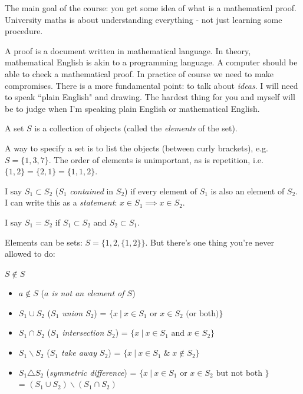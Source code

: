 \documentclass[10pt]{scrartcl}
\begin{document}
The main    goal of the course: you get some idea of what is a mathematical proof. University maths is about understanding everything - not just learning some procedure.

 A proof is a document written in mathematical language. In theory, mathematical English is akin to a programming language. A computer should be able to check a mathematical proof. In practice of course we need to make compromises. There is a more fundamental point: to talk about \emph{ideas}. I will need to speak ``plain English" and drawing.  The hardest thing for you and myself will be to judge when I'm speaking plain English or mathematical English.

\vspace*{5pt}
\label{sub:sets}

\begin{definition}
A set $S$ is  a collection of objects (called the \emph{elements} of the set).
\end{definition}
A way to specify a set is to list the objects (between curly brackets), e.g. $S = \{1,3,7\}$. The order of elements is unimportant, as is repetition, i.e. $\{1,2\} = \{2,1\} = \{1,1,2\}$.\\


\begin{definition}
I say $S_1 \subset S_2$ ($S_1$ \emph{contained} in $S_2$) if every element of $S_1$ is also an element of $S_2$. I can write this as a \emph{statement}: $x \in S_1 \implies x \in S_2$.

I say $S_1 = S_2$ if $S_1 \subset S_2$ and $S_2 \subset S_1$.
\end{definition}


 Elements can be sets: $S = \{1,2,\{1,2\}\}$. But there's one thing you're never allowed to do:\vspace*{5pt}

\begin{axiom}
$S \not \in S$	
\end{axiom}

\begin{definition}
\begin{itemize}
\item $a \not \in S$ (\emph{$a$ is not an element of $S$})
\item $S_1 \cup S_2$ (\emph{$S_1$ union $S_2$}) = $\{x ~|~ x \in S_1 \text{ or } x \in S_2 \text{ (or both)}\}$
\item $S_1 \cap S_2$ (\emph{$S_1$ intersection $S_2$}) = $\{x ~|~ x \in S_1 \text{ and } x \in S_2\}$
\item $S_1 \backslash S_2$ (\emph{$S_1$ take away $S_2$}) = $\{x ~|~ x \in S_1 \;\&\; x \not \in S_2\}$
\item $S_1 \triangle S_2$ (\emph{symmetric difference}) = $\{x ~|~ x \in S_1 \text{ or } x \in S_2 \text{ but not both }\}$\\ = $(S_1 \cup S_2) \backslash (S_1 \cap S_2)$
\end{itemize}
\end{definition}
\end{document}
